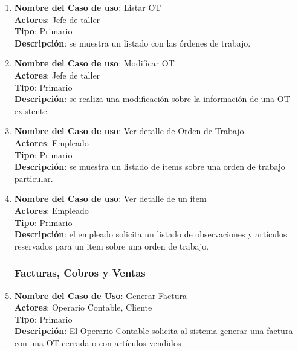 \documentclass[12pt]{extarticle}
\begin{document}
\begin{spacing}{1.2}
\begin{enumerate}
            \item 	\textbf{Nombre del Caso de uso}: Listar OT\\
                    \textbf{Actores}: Jefe de taller\\
                    \textbf{Tipo}: Primario\\
                    \textbf{Descripción}: se muestra un listado con las órdenes de trabajo.

            \item 	\textbf{Nombre del Caso de uso}: Modificar OT\\
                    \textbf{Actores}: Jefe de taller\\
                    \textbf{Tipo}: Primario\\
                    \textbf{Descripción}: se realiza una modificación sobre la información de una OT existente.

            \item 	\textbf{Nombre del Caso de uso}: Ver detalle de Orden de Trabajo\\
                    \textbf{Actores}: Empleado\\
                    \textbf{Tipo}: Primario\\
                    \textbf{Descripción}: se muestra un listado de ítems sobre una orden de trabajo particular.

            \item 	\textbf{Nombre del Caso de uso}: Ver detalle de un ítem\\
                    \textbf{Actores}: Empleado\\
                    \textbf{Tipo}: Primario\\
                    \textbf{Descripción}: el empleado solicita un listado de observaciones y artículos reservados para un item sobre una orden de trabajo.



            \subsubsection{Facturas, Cobros y Ventas}



            \item 	\textbf{Nombre del Caso de Uso}: Generar Factura\\
                    \textbf{Actores}: Operario Contable, Cliente\\
                    \textbf{Tipo}: Primario\\
                    \textbf{Descripción}: El Operario Contable solicita al sistema generar una factura con una OT cerrada o con artículos vendidos


\end{enumerate}
\end{spacing}
\end{document}
